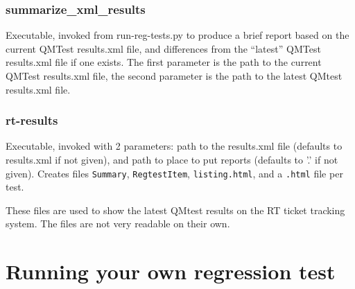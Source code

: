 \documentclass[11pt]{article}
\begin{document}
\subsubsection{summarize_xml_results}
Executable, invoked from run-reg-tests.py to produce a brief report based on
the current QMTest results.xml file, and differences from the ``latest''
QMTest results.xml file if one exists. The first parameter is the path to
the current QMTest results.xml file, the second parameter is the path to
the latest QMtest results.xml file.

\subsubsection{rt-results}
Executable, invoked with 2 parameters: path to the results.xml file (defaults
to results.xml if not given), 
and path to place to put reports (defaults to '.' if not given).
Creates files 
{\tt Summary}, 
{\tt RegtestItem}, 
{\tt listing.html},
and a {\tt .html} file per test.

These files are used to show the latest QMtest results on the 
RT ticket tracking system. 
 The files are not very readable on their own.


\section{Running your own regression test}
\end{document}
